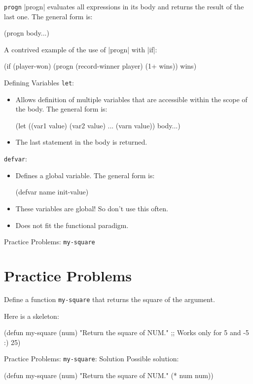 \documentclass{beamer}
\begin{document}

\begin{frame}[fragile]{\texttt{progn}}
  \cl|progn| evaluates all expressions in its body and returns the result of the last one. The general form is:
  \begin{clcode}
    (progn body...)
  \end{clcode}
A contrived example of the use of \cl|progn| with \cl|if|:
\begin{clcode}
(if (player-won)
  (progn
    (record-winner player)
    (1+ wins))
  wins)
\end{clcode}
\end{frame}

\begin{frame}[fragile]{Defining Variables}
\texttt{let}:
\begin{itemize}
\item Allows definition of multiple variables that are accessible
  within the scope of the body. The general form is:
\begin{clcode}
(let ((var1 value) (var2 value) ... (varn value))
  body...)
\end{clcode}
\item The last statement in the body is returned.
\end{itemize}
\texttt{defvar}:
\begin{itemize}
\item Defines a global variable. The general form is:
  \begin{clcode}
    (defvar name init-value)
  \end{clcode}
\item These variables are global! So don't use this often.
\item Does not fit the functional paradigm.
\end{itemize}
\end{frame}

\begin{frame}[fragile]{Practice Problems: \texttt{my-square}}
\section{Practice Problems}
  Define a function \texttt{my-square} that returns the square of the argument.

  Here is a skeleton:
  \begin{clcode}
(defun my-square (num)
  "Return the square of NUM."
  ;; Works only for 5 and -5 :)
  25)
  \end{clcode}
\end{frame}

\begin{frame}[fragile]{Practice Problems: \texttt{my-square}: Solution}
  Possible solution:
  \begin{clcode}
(defun my-square (num)
  "Return the square of NUM."
  (* num num))
  \end{clcode}
\end{frame}
\end{document}
